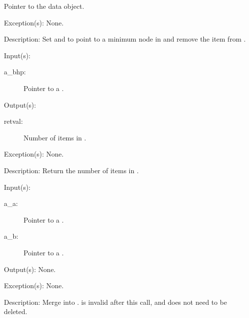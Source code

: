 \begin{capi}
\begin{capilist}
\begin{description}
			Pointer to the data object.
		\end{description}
	\item[Exception(s): ] None.
	\item[Description: ]
		Set  and  to point to a
		minimum node in  and remove the item from
		.
	\end{capilist}
\label{bhp_size_get}
	\begin{capilist}
	\item[Input(s): ]
		\begin{description}\item[]
		\item[a\_bhp: ]
			Pointer to a .
		\end{description}
	\item[Output(s): ]
		\begin{description}\item[]
		\item[retval: ]
			Number of items in .
		\end{description}
	\item[Exception(s): ] None.
	\item[Description: ]
		Return the number of items in .
	\end{capilist}
\label{bhp_union}
	\begin{capilist}
	\item[Input(s): ]
		\begin{description}\item[]
		\item[a\_a: ]
			Pointer to a \classname{bhp}.
		\item[a\_b: ]
			Pointer to a \classname{bhp}.
		\end{description}
	\item[Output(s): ] None.
	\item[Exception(s): ] None.
	\item[Description: ]
		Merge  into .   is invalid
		after this call, and does not need to be deleted.
	\end{capilist}
\label{bhp_priority_compare_uint32}
\end{capi}

